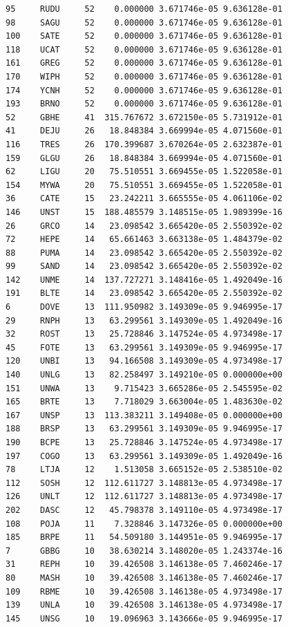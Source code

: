 \documentclass{statsoc}
\begin{document}
\begin{lstlisting}
95     RUDU     52    0.000000 3.671746e-05 9.636128e-01
98     SAGU     52    0.000000 3.671746e-05 9.636128e-01
100    SATE     52    0.000000 3.671746e-05 9.636128e-01
118    UCAT     52    0.000000 3.671746e-05 9.636128e-01
161    GREG     52    0.000000 3.671746e-05 9.636128e-01
170    WIPH     52    0.000000 3.671746e-05 9.636128e-01
174    YCNH     52    0.000000 3.671746e-05 9.636128e-01
193    BRNO     52    0.000000 3.671746e-05 9.636128e-01
52     GBHE     41  315.767672 3.672150e-05 5.731912e-01
41     DEJU     26   18.848384 3.669994e-05 4.071560e-01
116    TRES     26  170.399687 3.670264e-05 2.632387e-01
159    GLGU     26   18.848384 3.669994e-05 4.071560e-01
62     LIGU     20   75.510551 3.669455e-05 1.522058e-01
154    MYWA     20   75.510551 3.669455e-05 1.522058e-01
36     CATE     15   23.242211 3.665555e-05 4.061106e-02
146    UNST     15  188.485579 3.148515e-05 1.989399e-16
26     GRCO     14   23.098542 3.665420e-05 2.550392e-02
72     HEPE     14   65.661463 3.663138e-05 1.484379e-02
88     PUMA     14   23.098542 3.665420e-05 2.550392e-02
99     SAND     14   23.098542 3.665420e-05 2.550392e-02
142    UNME     14  137.727271 3.148416e-05 1.492049e-16
191    BLTE     14   23.098542 3.665420e-05 2.550392e-02
6      DOVE     13  111.950982 3.149309e-05 9.946995e-17
29     RNPH     13   63.299561 3.149309e-05 1.492049e-16
32     ROST     13   25.728846 3.147524e-05 4.973498e-17
45     FOTE     13   63.299561 3.149309e-05 9.946995e-17
120    UNBI     13   94.166508 3.149309e-05 4.973498e-17
140    UNLG     13   82.258497 3.149210e-05 0.000000e+00
151    UNWA     13    9.715423 3.665286e-05 2.545595e-02
165    BRTE     13    7.718029 3.663004e-05 1.483630e-02
167    UNSP     13  113.383211 3.149408e-05 0.000000e+00
188    BRSP     13   63.299561 3.149309e-05 9.946995e-17
190    BCPE     13   25.728846 3.147524e-05 4.973498e-17
197    COGO     13   63.299561 3.149309e-05 1.492049e-16
78     LTJA     12    1.513058 3.665152e-05 2.538510e-02
112    SOSH     12  112.611727 3.148813e-05 4.973498e-17
126    UNLT     12  112.611727 3.148813e-05 4.973498e-17
202    DASC     12   45.798378 3.149110e-05 4.973498e-17
108    POJA     11    7.328846 3.147326e-05 0.000000e+00
185    BRPE     11   54.509180 3.144951e-05 9.946995e-17
7      GBBG     10   38.630214 3.148020e-05 1.243374e-16
31     REPH     10   39.426508 3.146138e-05 7.460246e-17
80     MASH     10   39.426508 3.146138e-05 7.460246e-17
109    RBME     10   39.426508 3.146138e-05 4.973498e-17
139    UNLA     10   39.426508 3.146138e-05 4.973498e-17
145    UNSG     10   19.096963 3.143666e-05 9.946995e-17

\end{lstlisting}
\end{document}

